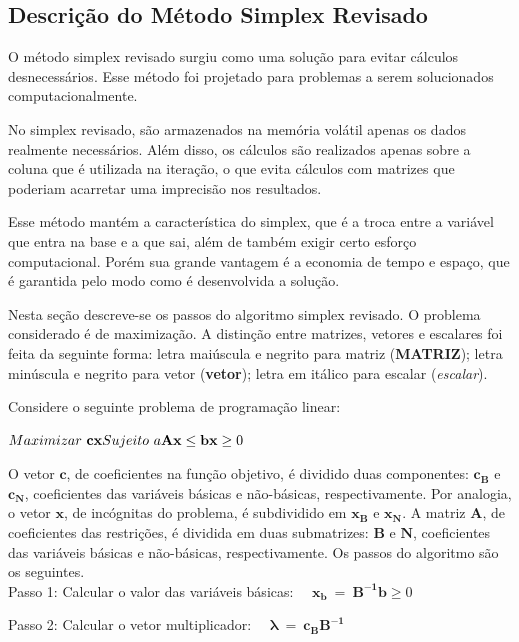 \subsection{Descrição do Método Simplex Revisado}
O método simplex revisado surgiu como uma solução para evitar cálculos desnecessários. Esse método foi projetado para problemas a serem solucionados computacionalmente.

No simplex revisado, são armazenados na memória volátil apenas os dados realmente necessários. Além disso, os cálculos são realizados apenas sobre a coluna que é utilizada na iteração, o que evita cálculos com matrizes que poderiam acarretar uma imprecisão nos resultados.

Esse método mantém a característica do simplex, que é a troca entre a variável que entra na base e a que sai, além de também exigir certo esforço computacional. Porém sua grande vantagem é a economia de tempo e espaço, que é garantida pelo modo como é desenvolvida a solução. 

Nesta seção descreve-se os passos do algoritmo simplex revisado. O problema considerado é de maximização. A distinção entre matrizes, vetores e escalares foi feita da seguinte forma: letra maiúscula e negrito para matriz (\textbf{MATRIZ}); letra minúscula e negrito para vetor (\textbf{vetor}); letra em itálico para escalar (\textit{escalar}).

Considere o seguinte problema de programação linear:

$\\
Maximizar\ \mathbf{cx} \\
Sujeito\ a \\
\mathbf{Ax} \leq \mathbf{b} \\
\mathbf{x} \geq0$

O vetor $\mathbf{c}$, de coeficientes na função objetivo, é dividido duas componentes: $\mathbf{c{_B}}$ e $\mathbf{c{_N}}$, coeficientes das variáveis básicas e não-básicas, respectivamente. Por analogia, o vetor $\mathbf{x}$, de incógnitas do problema, é subdividido em $\mathbf{x{_B}}$ e $\mathbf{x{_N}}$.  A matriz $\mathbf{A}$, de coeficientes das restrições, é dividida em duas submatrizes: $\mathbf{B}$ e $\mathbf{N}$, coeficientes das variáveis básicas e não-básicas, respectivamente. Os passos do algoritmo são os seguintes.\\

Passo 1: Calcular o valor das variáveis básicas: \ \ $\mathbf{x_{b}}\ =\ \mathbf{B^{-1}b}\geq0$

Passo 2: Calcular o vetor multiplicador: \ \ $\mathbf{\lambda} \ =\ \mathbf{c{_B}B^{-1}}$

